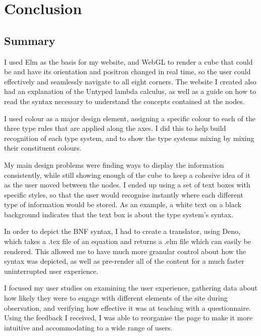 \documentclass{l4proj}
\begin{document}
\chapter{Conclusion}    

\section{Summary}

I used Elm as the basis for my website, and WebGL to render a cube that could be and have its orientation and positron changed in real time, so the user could effectively and seamlessly navigate to all eight corners. The website I created also had an explanation of the Untyped lambda calculus, as well as a guide on how to read the syntax necessary to understand the concepts contained at the nodes.

I used colour as a major design element, assigning a specific colour to each of the three type rules that are applied along the axes.  I did this to help build recognition of each type system, and to show the type systems mixing by mixing their constituent colours.

My main design problems were finding ways to display the information consistently, while still showing enough of the cube to keep a cohesive idea of it as the user moved between the nodes.  I ended up using a set of text boxes with specific styles, so that the user would recognise instantly where each different type of information would be stored.  As an example, a white text on a black background indicates that the text box is about the type system's syntax.

In order to depict the BNF syntax, I had to create a translator, using Deno, which takes a .tex file of an equation and returns a .elm file which can easily be rendered.  This allowed me to have much more granular control about how the syntax was depicted, as well as pre-render all of the content for a much faster uninterrupted user experience.

I focused my user studies on examining the user experience, gathering data about how likely they were to engage with different elements of the site during observation, and verifying how effective it was at teaching with a questionnaire.  Using the feedback I received, I was able to reorganise the page to make it more intuitive and accommodating to a wide range of users.
\end{document}
